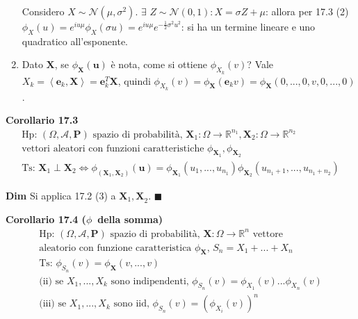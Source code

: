 \documentclass{article}
\begin{document}
\begin{enumerate}
Considero $X\sim \mathcal{N}\left( \mu ,\sigma ^{2}\right) $. $\exists $ $%
Z\sim \mathcal{N}\left( 0,1\right) :X=\sigma Z+\mu $: allora per 17.3 (2) $%
\phi _{X}\left( u\right) =e^{iu\mu }\phi _{X}\left( \sigma u\right)
=e^{iu\mu }e^{-\frac{1}{2}\sigma ^{2}u^{2}}$: si ha un termine lineare e uno
quadratico all'esponente.

\item Dato $\mathbf{X}$, se $\phi _{\mathbf{X}}\left( \mathbf{u}\right) $ 
\`{e} nota, come si ottiene $\phi _{X_{k}}\left( v\right) $? Vale $%
X_{k}=\left\langle \mathbf{e}_{k}\mathbf{,X}\right\rangle =\mathbf{e}_{k}^{T}%
\mathbf{X}$, quindi $\phi _{X_{k}}\left( v\right) =\phi _{\mathbf{X}}\left( 
\mathbf{e}_{k}v\right) =\phi _{\mathbf{X}}\left( 0,...,0,v,0,...,0\right) $.
\end{enumerate}

\textbf{Corollario 17.3}%
\begin{gather*}
\text{Hp: }\left( \Omega ,\mathcal{A},\mathbf{P}\right) \text{ spazio di
probabilit\`{a}, }\mathbf{X}_{1}:\Omega \rightarrow 
\mathbb{R}
^{n_{1}},\mathbf{X}_{2}:\Omega \rightarrow 
\mathbb{R}
^{n_{2}}\text{ } \\
\text{vettori aleatori con funzioni caratteristiche }\phi _{\mathbf{X}%
_{1}},\phi _{\mathbf{X}_{2}} \\
\text{Ts: }\mathbf{X}_{1}\mathbf{\perp X}_{2}\Longleftrightarrow \phi
_{\left( \mathbf{X}_{1},\mathbf{X}_{2}\right) }\left( \mathbf{u}\right)
=\phi _{\mathbf{X}_{1}}\left( u_{1},...,u_{n_{1}}\right) \phi _{\mathbf{X}%
_{2}}\left( u_{n_{1}+1},...,u_{n_{1}+n_{2}}\right)
\end{gather*}

\textbf{Dim} Si applica 17.2 (3) a $\mathbf{X}_{1}\mathbf{,X}_{2}$. $%
\blacksquare $

\textbf{Corollario 17.4 (}$\phi $\textbf{\ della somma)}%
\begin{gather*}
\text{Hp: }\left( \Omega ,\mathcal{A},\mathbf{P}\right) \text{ spazio di
probabilit\`{a}, }\mathbf{X}:\Omega \rightarrow 
\mathbb{R}
^{n}\text{ vettore } \\
\text{aleatorio con funzione caratteristica }\phi _{\mathbf{X}}\text{, }%
S_{n}=X_{1}+...+X_{n} \\
\text{Ts: }\phi _{S_{n}}\left( v\right) =\phi _{\mathbf{X}}\left(
v,...,v\right) \\
\text{(ii) se }X_{1},...,X_{k}\text{ sono indipendenti, }\phi _{S_{n}}\left(
v\right) =\phi _{X_{1}}\left( v\right) ...\phi _{X_{n}}\left( v\right) \\
\text{(iii) se }X_{1},...,X_{k}\text{ sono iid, }\phi _{S_{n}}\left(
v\right) =\left( \phi _{X_{i}}\left( v\right) \right) ^{n}
\end{gather*}
\end{document}
